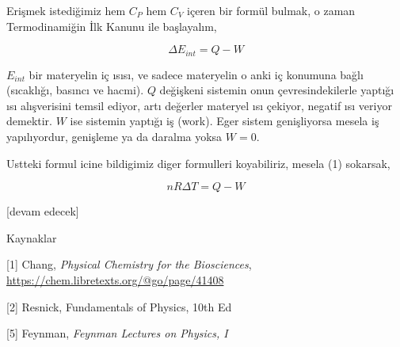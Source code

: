 \documentclass[12pt,fleqn]{article}\usepackage{../../common}
\begin{document}
Erişmek istediğimiz hem $C_P$ hem $C_V$ içeren bir formül bulmak, o zaman
Termodinamiğin İlk Kanunu ile başlayalım,

$$
\Delta E_{int} = Q - W
$$

$E_{int}$ bir materyelin iç ısısı, ve sadece materyelin o anki iç konumuna bağlı
(sıcaklığı, basıncı ve hacmi). $Q$ değişkeni sistemin onun çevresindekilerle
yaptığı ısı alışverisini temsil ediyor, artı değerler materyel ısı çekiyor,
negatif ısı veriyor demektir. $W$ ise sistemin yaptığı iş (work). Eger sistem
genişliyorsa mesela iş yapılıyordur, genişleme ya da daralma yoksa $W=0$.

Ustteki formul icine bildigimiz diger formulleri koyabiliriz, mesela (1)
sokarsak,

$$
n R \Delta T = Q - W
$$



[devam edecek]

Kaynaklar

[1] Chang, {\em Physical Chemistry for the Biosciences},
    \url{https://chem.libretexts.org/@go/page/41408}

[2] Resnick, Fundamentals of Physics, 10th Ed

[5] Feynman, {\em Feynman Lectures on Physics, I}
\end{document}

